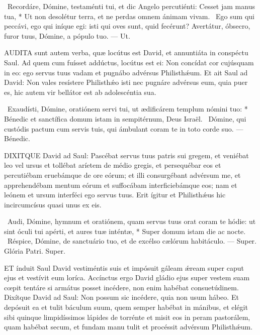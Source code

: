 \R\ Recordáre, Dómine, testaménti tui, et dic Angelo percutiénti: Cesset jam manus tua, * Ut non desolétur terra, et ne perdas omnem ánimam vivam. \V\ Ego sum qui peccávi, ego qui iníque egi: isti qui oves sunt, quid fecérunt? Avertátur, óbsecro, furor tuus, Dómine, a pópulo tuo. --- Ut.


\lettrine[lines=2]{A}{UDITA} sunt autem verba, quæ locútus est David, et annuntiáta in conspéctu Saul. Ad quem cum fuísset addúctus, locútus est ei: Non concídat cor cujúsquam in eo: ego servus tuus vadam et pugnábo advérsus Philisthǽum. Et ait Saul ad David: Non vales resístere Philisthǽo isti nec pugnáre advérsus eum, quia puer es, hic autem vir bellátor est ab adolescéntia sua.

\R\ Exaudísti, Dómine, oratiónem servi tui, ut ædificárem templum nómini tuo: * Bénedic et sanctífica domum istam in sempitérnum, Deus Israël. \V\ Dómine, qui custódis pactum cum servis tuis, qui ámbulant coram te in toto corde suo. --- Bénedic.



\lettrine[lines=2]{D}{IXITQUE} David ad Saul: Pascébat servus tuus patris sui gregem, et veniébat leo vel ursus et tollébat aríetem de médio gregis, et persequébar eos et percutiébam eruebámque de ore eórum; et illi consurgébant advérsum me, et apprehendébam mentum eórum et suffocábam interficiebámque eos; nam et leónem et ursum interféci ego servus tuus. Erit ígitur et Philisthǽus hic incircumcísus quasi unus ex eis.

\R\ Audi, Dómine, hymnum et oratiónem, quam servus tuus orat coram te hódie: ut sint óculi tui apérti, et aures tuæ inténtæ, * Super domum istam die ac nocte. \V\ Réspice, Dómine, de sanctuário tuo, et de excélso cælórum habitáculo. --- Super. Glória Patri. Super.




\lettrine[lines=2]{E}{T} índuit Saul David vestiméntis suis et impósuit gáleam ǽream super caput ejus et vestívit eum loríca. Accínctus ergo David gládio ejus super vestem suam cœpit tentáre si armátus posset incédere, non enim habébat consuetúdinem. Dixítque David ad Saul: Non possum sic incédere, quia non usum hábeo. Et depósuit ea et tulit báculum suum, quem semper habébat in mánibus, et elégit sibi quinque limpidíssimos lápides de torrénte et misit eos in peram pastorálem, quam habébat secum, et fundam manu tulit et procéssit advérsum Philisthǽum.

